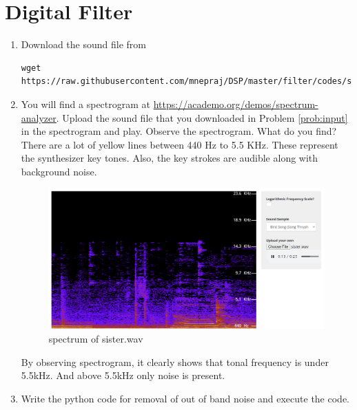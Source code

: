 \documentclass[journal,12pt,twocolumn]{IEEEtran}
\renewcommand\thesection{\arabic{section}}
\begin{document}
\section{Digital Filter}
\begin{enumerate}[label=\thesection.\arabic*
		,ref=\thesection.\theenumi]
	\item
	      \label{prob:input}
	      Download the sound file from
	      \begin{lstlisting}
wget https://raw.githubusercontent.com/mnepraj/DSP/master/filter/codes/sister.wav
\end{lstlisting}
	\item
	      \label{prob:spectrogram}
	      You will find a spectrogram at \href{https://academo.org/demos/spectrum-analyzer}{\url{https://academo.org/demos/spectrum-analyzer}}.
	      Upload the sound file that you downloaded in Problem \ref{prob:input} in the spectrogram  and play.  Observe the spectrogram. What do you find?
	      \\
	      \solution There are a lot of yellow lines between 440 Hz to 5.5 KHz.  These represent the synthesizer key tones. Also, the key strokes
	      are audible along with background noise.
	      \begin{figure}[h]
		      \centering
		      \includegraphics[width=\columnwidth]{figs/sisterspectrum.png}
		      \caption{spectrum of sister.wav}
		      \label{fig:audiospectrum}
	      \end{figure}
	      By observing spectrogram, it clearly shows that tonal frequency is under 5.5kHz. And above 5.5kHz only noise is present.
	\item
	      \label{prob:output}
	      Write the python code for removal of out of band noise and execute the code.
	      \\
	      \solution
	      


\end{enumerate}
\end{document}
